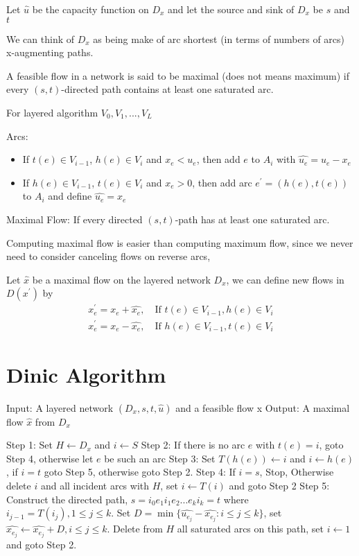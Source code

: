 			Let $\hat{u}$ be the capacity function on $D_x$ and let the source and sink of $D_x$ be $s$ and $t$

			We can think of $D_x$ as being make of arc shortest (in terms of numbers of arcs) x-augmenting paths.

			A feasible flow in a network is said to be maximal (does not means maximum) if every $(s, t)$-directed path contains at least one saturated arc.

			For layered algorithm $V_0, V_1, ..., V_L$

			Arcs:
			\begin{itemize}
				\item If $t(e)\in V_{i-1}$, $h(e) \in V_i$ and $x_e < u_e$, then add $e$ to $A_i$ with $\hat{u_e} = u_e - x_e$
				\item If $h(e) \in V_{i-1}$, $t(e)\in V_i$ and $x_e > 0$, then add arc $e^\prime = (h(e), t(e))$ to $A_i$ and define $\hat{u_e} = x_e$
			\end{itemize}

			Maximal Flow: If every directed $(s, t)$-path has at least one saturated arc.

			Computing maximal flow is easier than computing maximum flow, since we never need to consider canceling flows on reverse arcs,

			Let $\hat{x}$ be a maximal flow on the layered network $D_x$, we can define new flows in $D(x^\prime)$ by
			\begin{align}
				x_e^\prime = x_e + \hat{x_e}, \quad \text{If } t(e) \in V_{i-1}, h(e)\in V_i\\
				x_e^\prime = x_e - \hat{x_e}, \quad \text{If } h(e) \in V_{i-1}, t(e)\in V_i
			\end{align}

		\section{Dinic Algorithm}
			Input: A layered network $(D_x, s, t, \hat{u})$ and a feasible flow x
			Output: A maximal flow $\hat{x}$ from $D_x$

			Step 1: Set $H\gets D_x$ and $i\gets S$
			Step 2: If there is no arc $e$ with $t(e) = i$, goto Step 4, otherwise let $e$ be such an arc
			Step 3: Set $T(h(e))\gets i$ and $i \gets h(e)$, if $i= t$ goto Step 5, otherwise goto Step 2.
			Step 4: If $i = s$, Stop, Otherwise delete $i$ and all incident arcs with $H$, set $i \gets T(i)$ and goto Step 2
			Step 5: Construct the directed path, $s = i_0e_1i_1e_2...e_ki_k=t$ where $i_{j-1} = T(i_j), 1\le j \le k$. Set $D=\min\{\hat{u_{e_j}}-\hat{x_{e_j}}:i\le j \le k\}$, set $\hat{x_{e_j}} \gets \hat{x_{e_j}} + D, i \le j \le k$. Delete from $H$ all saturated arcs on this path, set $i \gets 1$ and goto Step 2.


